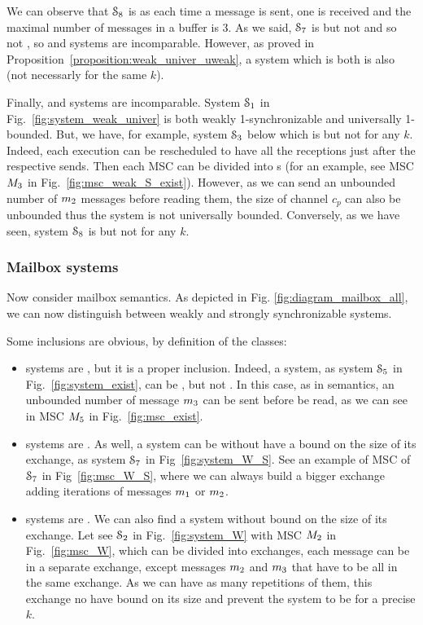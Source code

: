 We can observe that $\mathcal{S}_{8}$ is  as each time a
message is sent, one is received and
the maximal number of messages in a buffer is 3. As we said, $\mathcal{S}_{7}$ is \wS{} but not \eb{} and so not \ub{}, so \wS{} and \ub{} systems are incomparable.
However, as proved in Proposition~\ref{proposition:weak_univer_uweak}, a system which is both is also  (not necessarly for the same $k$).

Finally,  and  systems are incomparable. System $\mathcal{S}_{1}$ in
Fig.~\ref{fig:system_weak_univer} is  both weakly 1-synchronizable and
universally 1-bounded.   But,  we have, for example, system $\mathcal{S}_{3}$ below
which is  but not  for any $k$.  Indeed,
each execution can be rescheduled to have all the receptions just after the
respective sends. Then each MSC can be divided into s  (for an example,
see  MSC $M_{3}$ in Fig.~\ref{fig:msc_weak_S_exist}). However, as we can send an
unbounded number of $m_2$ messages before reading them, the size of channel
$c_p$ can also be unbounded thus the system is not universally bounded.
Conversely, as we have seen, system $\mathcal{S}_{8}$ is  but not  for any $k$.



\subsubsection{Mailbox systems }

Now consider  mailbox semantics. As depicted in Fig. \ref{fig:diagram_mailbox_all}, we can now distinguish between weakly and strongly synchronizable systems.

Some inclusions are obvious, by definition of the classes:
\begin{itemize}
  \item \ub{} systems are \eb{}, but it is a proper inclusion. Indeed, a system, as system $\mathcal{S}_{5}$ in Fig.~\ref{fig:system_exist}, can be , but not \ub{}. In this case, as in \pp semantics, an unbounded number of message $m_3$ can be sent before be read, as we can see in MSC $M_{5}$ in Fig.~\ref{fig:msc_exist}.
  \item {} systems are \sS{}. As well, a system can be \sS{} without have a bound on the size of its exchange, as system $\mathcal{S}_{7}$ in Fig~\ref{fig:system_W_S}. See an example of MSC of $\mathcal{S}_{7}$ in Fig~\ref{fig:msc_W_S}, where we can always build a bigger exchange adding iterations of messages $m_1$ or $m_2$.
  \item {} systems are \wS{}. We can also find a \wS{} system without bound on the size of its exchange. Let see $\mathcal{S}_{2}$ in Fig.~\ref{fig:system_W} with MSC $M_{2}$ in Fig.~\ref{fig:msc_W}, which can be divided into exchanges, each message can be in a separate exchange, except messages $m_2$ and $m_3$ that have to be all in the same exchange. As we can have as many repetitions of them, this exchange no have bound on its size and prevent the system to be  for a precise $k$.
\end{itemize}




